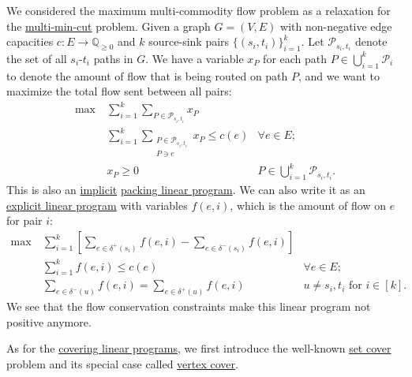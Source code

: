 \begin{eg}\label{eg:maximum-multi-commodity-flow-MWU}
	We considered the maximum multi-commodity flow problem as a relaxation for the \hyperref[prb:multi-min-cut]{multi-min-cut} problem. Given a graph \(G = (V, E)\) with non-negative edge capacities \(c \colon E \to \mathbb{Q} _{\geq 0}\) and \(k\) source-sink pairs \(\{ (s_i, t_i) \} _{i=1}^{k}\). Let \(\mathcal{P} _{s_i, t_i}\) denote the set of all \(s_i\)-\(t_i\) paths in \(G\). We have a variable \(x_P\) for each path \(P \in \bigcup_{i=1}^{k} \mathcal{P} _i\) to denote the amount of flow that is being routed on path \(P\), and we want to maximize the total flow sent between all pairs:
	\[
		\begin{aligned}
			\max~ & \sum_{i=1}^{k} \sum_{P \in \mathcal{P} _{s_i, t_i}} x_P                                                         \\
			      & \sum_{i=1}^{k} \sum_{\substack{P \in\mathcal{P} _{s_i, t_i}                                                     \\ P \ni e}} x_P \leq c(e) & \forall e \in E ;                                  \\
			      & x_P \geq 0                                                  & P \in \bigcup_{i=1}^{k} \mathcal{P} _{s_i, t_i} .
		\end{aligned}
	\]
	This is also an \hyperref[def:implicit-LP]{implicit} \hyperref[def:packing-LP]{packing linear program}. We can also write it as an \hyperref[def:explicit-LP]{explicit linear program} with variables \(f(e, i)\), which is the amount of flow on \(e\) for pair \(i\):
	\[
		\begin{aligned}
			\max~ & \sum_{i=1}^{k} \left[ \sum_{e \in \delta ^+ (s_i) } f(e, i) - \sum_{e \in \delta ^- (s_i) } f(e, i) \right]                                           \\
			      & \sum_{i=1}^{k} f(e, i) \leq c(e)                                                                            & \forall e \in E ;                       \\
			      & \sum_{e \in \delta ^-(u)} f(e, i) = \sum_{e \in \delta ^+(u)} f(e, i)                                       & u \neq s_i, t_i \text{ for } i \in [k].
		\end{aligned}
	\]
	We see that the flow conservation constraints make this linear program not positive anymore.
\end{eg}

As for the \hyperref[def:covering-LP]{covering linear programs}, we first introduce the well-known \hyperref[prb:set-cover]{set cover} problem and its special case called \hyperref[prb:vertex-cover]{vertex cover}.

